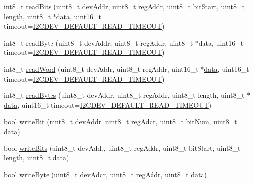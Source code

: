 \begin{DoxyCompactItemize}
\item 
int8\+\_\+t \mbox{\hyperlink{classI2Cdev_a362d1d9bf44d01f0dfd7db94df8a61e5}{read\+Bits}} (uint8\+\_\+t dev\+Addr, uint8\+\_\+t reg\+Addr, uint8\+\_\+t bit\+Start, uint8\+\_\+t length, uint8\+\_\+t $\ast$\mbox{\hyperlink{classperif_1_1PerifBase_a1a3afaa535fda17e9f97123fffe78765}{data}}, uint16\+\_\+t timeout=\mbox{\hyperlink{I2Cdev_8h_ad9726bb02451bb8f59d3d2729e4cd20e}{I2\+C\+D\+E\+V\+\_\+\+D\+E\+F\+A\+U\+L\+T\+\_\+\+R\+E\+A\+D\+\_\+\+T\+I\+M\+E\+O\+UT}})
\item 
int8\+\_\+t \mbox{\hyperlink{classI2Cdev_a80bf7daa6a6c34df95de78ac54d01b1f}{read\+Byte}} (uint8\+\_\+t dev\+Addr, uint8\+\_\+t reg\+Addr, uint8\+\_\+t $\ast$\mbox{\hyperlink{classperif_1_1PerifBase_a1a3afaa535fda17e9f97123fffe78765}{data}}, uint16\+\_\+t timeout=\mbox{\hyperlink{I2Cdev_8h_ad9726bb02451bb8f59d3d2729e4cd20e}{I2\+C\+D\+E\+V\+\_\+\+D\+E\+F\+A\+U\+L\+T\+\_\+\+R\+E\+A\+D\+\_\+\+T\+I\+M\+E\+O\+UT}})
\item 
int8\+\_\+t \mbox{\hyperlink{classI2Cdev_af62cd3a62562c704c6f183ea7a42064d}{read\+Word}} (uint8\+\_\+t dev\+Addr, uint8\+\_\+t reg\+Addr, uint16\+\_\+t $\ast$\mbox{\hyperlink{classperif_1_1PerifBase_a1a3afaa535fda17e9f97123fffe78765}{data}}, uint16\+\_\+t timeout=\mbox{\hyperlink{I2Cdev_8h_ad9726bb02451bb8f59d3d2729e4cd20e}{I2\+C\+D\+E\+V\+\_\+\+D\+E\+F\+A\+U\+L\+T\+\_\+\+R\+E\+A\+D\+\_\+\+T\+I\+M\+E\+O\+UT}})
\item 
int8\+\_\+t \mbox{\hyperlink{classI2Cdev_ab1ba3954fcc16341aa6e04e0a569c0ea}{read\+Bytes}} (uint8\+\_\+t dev\+Addr, uint8\+\_\+t reg\+Addr, uint8\+\_\+t length, uint8\+\_\+t $\ast$\mbox{\hyperlink{classperif_1_1PerifBase_a1a3afaa535fda17e9f97123fffe78765}{data}}, uint16\+\_\+t timeout=\mbox{\hyperlink{I2Cdev_8h_ad9726bb02451bb8f59d3d2729e4cd20e}{I2\+C\+D\+E\+V\+\_\+\+D\+E\+F\+A\+U\+L\+T\+\_\+\+R\+E\+A\+D\+\_\+\+T\+I\+M\+E\+O\+UT}})
\item 
bool \mbox{\hyperlink{classI2Cdev_aa68890af87de5471d32e583ebbd91acb}{write\+Bit}} (uint8\+\_\+t dev\+Addr, uint8\+\_\+t reg\+Addr, uint8\+\_\+t bit\+Num, uint8\+\_\+t \mbox{\hyperlink{classperif_1_1PerifBase_a1a3afaa535fda17e9f97123fffe78765}{data}})
\item 
bool \mbox{\hyperlink{classI2Cdev_a913371251b6a41520c080115650e1b59}{write\+Bits}} (uint8\+\_\+t dev\+Addr, uint8\+\_\+t reg\+Addr, uint8\+\_\+t bit\+Start, uint8\+\_\+t length, uint8\+\_\+t \mbox{\hyperlink{classperif_1_1PerifBase_a1a3afaa535fda17e9f97123fffe78765}{data}})
\item 
bool \mbox{\hyperlink{classI2Cdev_aeb297637ef985cd562da465ba61b7042}{write\+Byte}} (uint8\+\_\+t dev\+Addr, uint8\+\_\+t reg\+Addr, uint8\+\_\+t \mbox{\hyperlink{classperif_1_1PerifBase_a1a3afaa535fda17e9f97123fffe78765}{data}})

\end{DoxyCompactItemize}
